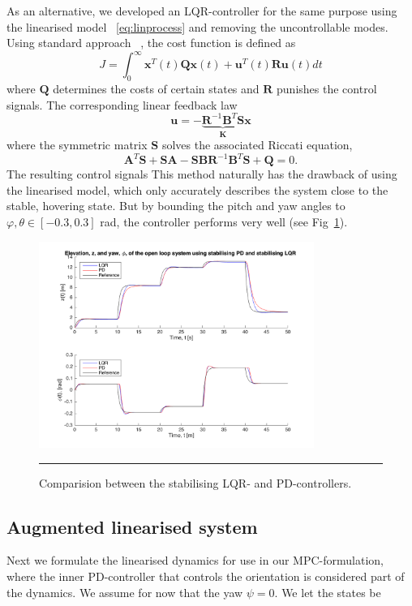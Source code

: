 \documentclass{article}
\begin{document}
As an alternative, we developed an LQR-controller for the same purpose using the linearised model ~\eqref{eq:linprocess} and removing the uncontrollable modes. Using standard approach ~\cite{glad2000control}, the cost function is defined as
\begin{equation}
J = \int_0^{\infty} \mathbf{x}^T(t)\mathbf{Q}\mathbf{x}(t) + \mathbf{u}^T(t)\mathbf{R}\mathbf{u}(t)dt
\end{equation}
where $\mathbf{Q}$ determines the costs of certain states and $\mathbf{R}$ punishes the control signals. The corresponding linear feedback law
\begin{equation}
\mathbf{u}= -\underbrace{\mathbf{R}^{-1}\mathbf{B}^T\mathbf{S} }_{\mathbf{K}}\mathbf{x}
\end{equation}
where the symmetric matrix $\mathbf{S}$ solves the associated Riccati equation,
\begin{equation}
\mathbf{A}^T\mathbf{S}+\mathbf{S}\mathbf{A}-\mathbf{S}\mathbf{B}\mathbf{R}^{-1}\mathbf{B}^T\mathbf{S}+\mathbf{Q}=0.
\end{equation}
The resulting control signals 
This method naturally has the drawback of using the linearised model, which only accurately describes the system close to the stable, hovering state. But by bounding the pitch and yaw angles to $\varphi,\theta \in [-0.3,0.3]$ rad, the controller performs very well (see Fig~\ref{fig:LQR-PD-comp}).

\begin{figure}[htbp]
\centering
\includegraphics[width=0.8\textwidth]{figures/LQR-PD-comp.png}
\rule{35em}{0.5pt}
\caption{Comparision between the stabilising LQR- and PD-controllers.}
\label{fig:LQR-PD-comp}
\end{figure}

\subsection{Augmented linearised system}
Next we formulate the linearised dynamics for use in our MPC-formulation, where the inner PD-controller that controls the orientation is considered part of the dynamics. We assume for now that the yaw $\psi = 0$. We let the states be
\end{document}
